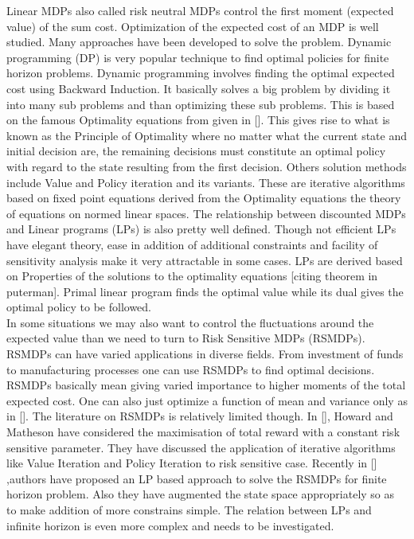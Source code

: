\documentclass[10pt,a4paper,oneside]{report}
\begin{document}
\noindent Linear MDPs also called risk neutral MDPs control the first moment (expected value) of the sum cost. Optimization of the expected cost of an MDP is well studied. Many approaches have been developed to solve the problem. Dynamic programming (DP) is very popular technique to find optimal policies for finite horizon problems. Dynamic programming involves finding the optimal expected cost using Backward Induction. It basically solves a big problem by dividing it into many sub problems and than optimizing these sub problems. This is based on the famous Optimality equations from given in []. This gives rise to what is known as the Principle of Optimality where no matter what the current state and initial decision are, the remaining decisions must constitute an optimal policy with regard to the state resulting from the first decision. Others solution methods include Value and Policy iteration and its variants. These are iterative algorithms based on fixed point equations derived from the Optimality equations the theory of equations on normed linear spaces. The relationship between discounted MDPs and Linear programs (LPs) is also pretty well defined. Though not efficient LPs have elegant theory, ease in addition of additional constraints and facility of sensitivity analysis make it very attractable in some cases. LPs are derived based on Properties of the solutions to the optimality equations [citing theorem in puterman]. Primal linear program finds the optimal value while its dual gives the optimal policy to be followed.\\


In some situations we may also want to control the fluctuations around the expected value than we need to turn to Risk Sensitive MDPs (RSMDPs). RSMDPs can have varied applications in diverse fields. From investment of funds to manufacturing processes one can use RSMDPs to find optimal decisions. RSMDPs basically mean giving varied importance to higher moments of the total expected cost. One can also just optimize a function of mean and variance only as in [].  The literature on RSMDPs is relatively limited though. In [], Howard and Matheson have considered the maximisation of total reward with a constant risk sensitive parameter. They have discussed the application of iterative algorithms like Value Iteration and Policy Iteration to risk sensitive case. Recently in [] ,authors have proposed an LP based approach to solve the RSMDPs for finite horizon problem. Also they have augmented the state space appropriately so as to make addition of more constrains simple. The relation between LPs and infinite horizon is even more complex and needs to be investigated.\\ 
\end{document}
